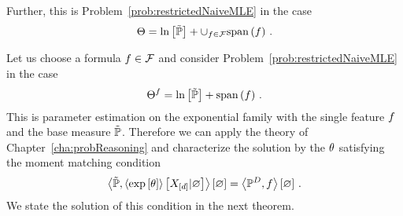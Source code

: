 Further, this is Problem~\eqref{prob:restrictedNaiveMLE} in the case
\begin{align*}
	\Theta = \ln \left[ \tilde{\mathbb{P}} \right] + \cup_{f\in\mathcal{F}} \mathrm{span}\left(f\right) \, .
\end{align*}



Let us choose a formula $f\in\mathcal{F}$ and consider Problem~\ref{prob:restrictedNaiveMLE}  in the case
\begin{align*}
	\Theta^{f} = \ln \left[ \tilde{\mathbb{P}} \right] + \mathrm{span}\left(f\right) \, . 
\end{align*}
This is parameter estimation on the exponential family with the single feature $f$ and the base measure $\tilde{\mathbb{P}}$.
Therefore we can apply the theory of Chapter~\ref{cha:probReasoning} and characterize the solution by the $\theta$ satisfying the moment matching condition
\begin{align*}
	\left\langle \tilde{\mathbb{P}}, \left\langle \mathrm{exp}\left[\theta\right]\right\rangle \left[ X_{[d]} | \varnothing \right] \right\rangle \left[ \varnothing \right] = \left\langle \mathbb{P}^{D}, f\right\rangle \left[ \varnothing \right] \, . 
\end{align*}
We state the solution of this condition in the next theorem.

